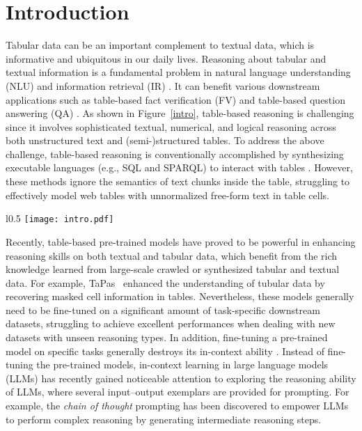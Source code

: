 \documentclass{article}
\begin{document}
\section{Introduction}

Tabular data can be an important complement to textual data, which is informative and ubiquitous in our daily lives. Reasoning about tabular and textual information is a fundamental problem in natural language understanding (NLU) and information retrieval (IR) \citep{wang2021retrieving}. 
It can benefit various downstream applications such as table-based fact verification (FV) \citep{tabfact,feverous,infotabs} and table-based question answering (QA) \citep{wtq,wikisql,fetaqa,cho2019sigirtable}. As shown in Figure~\ref{intro}, table-based reasoning is challenging since it involves sophisticated textual, numerical, and logical reasoning across both unstructured text and (semi-)structured tables. 
To address the above challenge, table-based reasoning is conventionally accomplished by synthesizing executable languages (e.g., SQL and SPARQL) to interact with tables \citep{sqlguide,sparql,Hui2021DynamicHR,Hui2022S2SQLIS}. However, these methods ignore the semantics of text chunks inside the table, struggling to effectively model web tables with unnormalized free-form text in table cells.

\begin{wrapfigure}{l}{0.5\textwidth}
    \centering
    \setlength{\abovecaptionskip}{5pt}
    \texttt{[image: intro.pdf]}
    \caption{An example of table-based reasoning.}
    \label{intro}
\end{wrapfigure}

Recently, table-based pre-trained models\citep{tapas,tapex,omnitab,pasta,Cai2022STARSG} have proved to be powerful in enhancing reasoning skills on both textual and tabular data, which benefit from the rich knowledge learned from large-scale crawled or synthesized tabular and textual data. For example, TaPas~\citep{tapas} enhanced the understanding of tubular data by recovering masked cell information in  tables. 
Nevertheless, these models generally need to be fine-tuned on a significant amount of task-specific downstream datasets, struggling to achieve excellent performances when dealing with new datasets with unseen reasoning types. In addition, fine-tuning a pre-trained model on specific tasks generally destroys its in-context ability \citep{wang2022preserving}. Instead of fine-tuning the pre-trained models, in-context learning in large language models (LLMs) \citep{gpt3,cot,zerocot,min2022rethinking} has recently gained noticeable attention to exploring the reasoning ability of LLMs, where several input–output exemplars are provided for prompting. For example, the \textit{chain of thought} prompting \citep{cot} has been discovered to empower LLMs to perform complex reasoning by generating intermediate reasoning steps.
\end{document}
